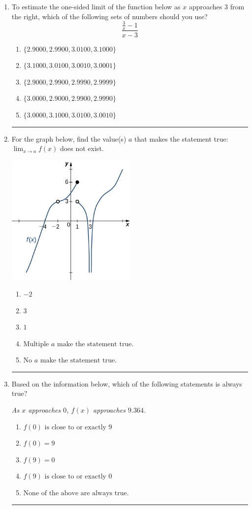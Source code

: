 \documentclass[14pt]{extbook}
\newcommand{\litem}[1]{\item#1\hspace*{-1cm}\rule{\textwidth}{0.4pt}}
\begin{document}
\begin{enumerate}
{\begin{enumerate}[label=\Alph*.]
\end{enumerate} }
\litem{
To estimate the one-sided limit of the function below as $x$ approaches 3 from the right, which of the following sets of numbers should you use?\[ \frac{\frac{3}{x} - 1}{x - 3} \]\begin{enumerate}[label=\Alph*.]
\item \( \{ 2.9000, 2.9900, 3.0100, 3.1000 \} \)
\item \( \{ 3.1000, 3.0100, 3.0010, 3.0001 \} \)
\item \( \{ 2.9000, 2.9900, 2.9990, 2.9999 \} \)
\item \( \{ 3.0000, 2.9000, 2.9900, 2.9990 \} \)
\item \( \{ 3.0000, 3.1000, 3.0100, 3.0010 \} \)

\end{enumerate} }
\litem{
For the graph below, find the value(s) $a$ that makes the statement true: $ \displaystyle \lim_{x \rightarrow a} f(x)$ does not exist.
\begin{center}
    \includegraphics[width=0.5\textwidth]{../Figures/evaluateLimitGraphicallyB.png}
\end{center}
\begin{enumerate}[label=\Alph*.]
\item \( -2 \)
\item \( 3 \)
\item \( 1 \)
\item \( \text{Multiple } a \text{ make the statement true}. \)
\item \( \text{No } a \text{ make the statement true}. \)

\end{enumerate} }
\litem{
Based on the information below, which of the following statements is always true?
\begin{center}
    \textit{ As $x$ approaches $0$, $f(x)$ approaches $9.364$. }
\end{center}
\begin{enumerate}[label=\Alph*.]
\item \( f(0) \text{ is close to or exactly } 9 \)
\item \( f(0) = 9 \)
\item \( f(9) = 0 \)
\item \( f(9) \text{ is close to or exactly } 0 \)
\item \( \text{None of the above are always true.} \)


\end{enumerate}}
\end{enumerate}
\end{document}
